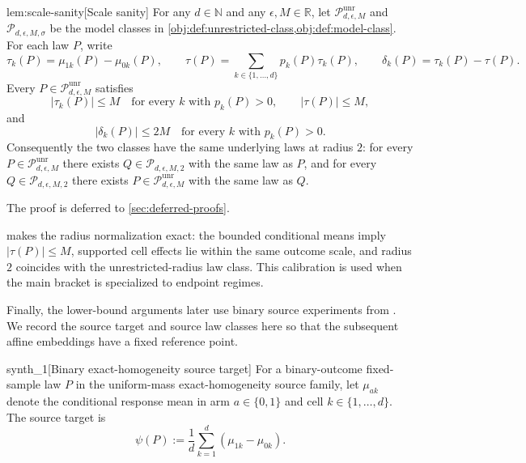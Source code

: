 \documentclass[11pt]{article}
\begin{document}
\begin{lemmav}{lem:scale-sanity}[Scale sanity]
For any \(d\in\mathbb N\) and any \(\epsilon,M\in\mathbb R\), let \(\mathcal P_{d,\epsilon,M}^{\mathrm{unr}}\) and \(\mathcal P_{d,\epsilon,M,\sigma}\) be the model classes in \cref{obj:def:unrestricted-class,obj:def:model-class}. For each law \(P\), write
\[
\tau_k(P)=\mu_{1k}(P)-\mu_{0k}(P),
\qquad
\tau(P)=\sum_{k\in\{1,\ldots,d\}} p_k(P)\tau_k(P),
\qquad
\delta_k(P)=\tau_k(P)-\tau(P).
\]
Every \(P\in\mathcal P_{d,\epsilon,M}^{\mathrm{unr}}\) satisfies
\[
|\tau_k(P)|\le M\quad\text{for every }k\text{ with }p_k(P)>0,
\qquad
|\tau(P)|\le M,
\]
and
\[
|\delta_k(P)|\le 2M\quad\text{for every }k\text{ with }p_k(P)>0.
\]
Consequently the two classes have the same underlying laws at radius \(2\): for every \(P\in\mathcal P_{d,\epsilon,M}^{\mathrm{unr}}\) there exists \(Q\in\mathcal P_{d,\epsilon,M,2}\) with the same law as \(P\), and for every \(Q\in\mathcal P_{d,\epsilon,M,2}\) there exists \(P\in\mathcal P_{d,\epsilon,M}^{\mathrm{unr}}\) with the same law as \(Q\).
\end{lemmav}

The proof is deferred to \cref{sec:deferred-proofs}.

 makes the radius normalization exact: the bounded conditional means imply \(|\tau(P)|\le M\), supported cell effects lie within the same outcome scale, and radius \(2\) coincides with the unrestricted-radius law class. This calibration is used when the main bracket is specialized to endpoint regimes.

Finally, the lower-bound arguments later use binary source experiments from \citet{ZengBalakrishnanHanKennedy2024}. We record the source target and source law classes here so that the subsequent affine embeddings have a fixed reference point.

\begin{definitionv}{synth_1}[Binary exact-homogeneity source target]
For a binary-outcome fixed-sample law \(P\) in the uniform-mass exact-homogeneity source family, let \(\mu_{ak}\) denote the conditional response mean in arm \(a\in\{0,1\}\) and cell \(k\in\{1,\ldots,d\}\). The source target is\[\psi(P):=\frac{1}{d}\sum_{k=1}^{d}(\mu_{1k}-\mu_{0k}).\]
\end{definitionv}
\end{document}
